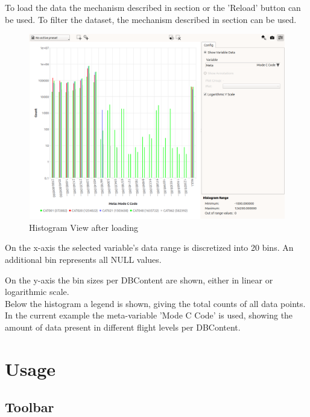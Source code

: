 To load the data the mechanism described in section  or the 'Reload' button can be used. To filter the dataset, the mechanism described in section  can be used. \\

\begin{figure}[H]
    \hspace*{-2cm}
    \includegraphics[width=18cm,frame]{figures/histogram_loaded.png}
  \caption{Histogram View after loading}
\end{figure}

On the x-axis the selected variable's data range is discretized into 20 bins. An additional bin represents all NULL values.

On the y-axis the bin sizes per DBContent are shown, either in linear or logarithmic scale. \\

Below the histogram a legend is shown, giving the total counts of all data points. \\

In the current example the meta-variable 'Mode C Code' is used, showing the amount of data present in different flight levels per DBContent.

\section{Usage}

\subsection{Toolbar}

